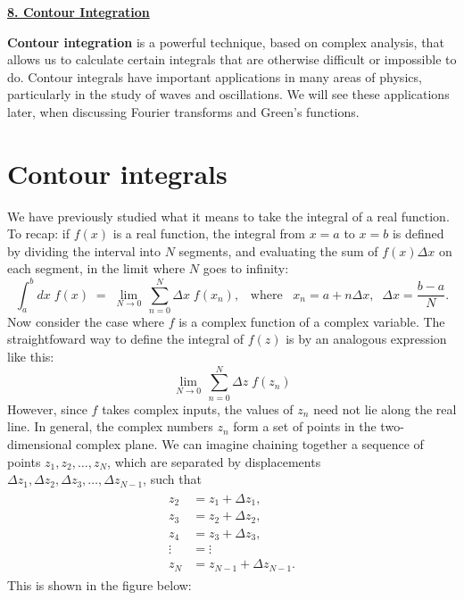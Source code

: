 \documentclass[10pt,a4paper]{article}
\begin{document}
\setcounter{page}{55}
\noindent
\underline{\textbf{\LARGE 8. Contour Integration}}
\vskip 0.1in

\textbf{Contour integration} is a powerful technique, based on complex
analysis, that allows us to calculate certain integrals that are
otherwise difficult or impossible to do. Contour integrals have
important applications in many areas of physics, particularly in the
study of waves and oscillations. We will see these applications later,
when discussing Fourier transforms and Green's functions.

\section{Contour integrals}\label{contour-integrals}

We have previously studied what it means to take the integral of a
real function. To recap: if $f(x)$ is a real function, the integral
from $x=a$ to $x=b$ is defined by dividing the interval into $N$
segments, and evaluating the sum of $f(x)\Delta x$ on each segment, in
the limit where $N$ goes to infinity:
\begin{equation}
  \int_a^b dx\; f(x) \;=\; \lim_{N \rightarrow 0} \, \sum_{n=0}^{N} \Delta x\; f(x_n), \;\;\;\mathrm{where}\;\;\;x_n = a + n\Delta x, \;\;\Delta x = \frac{b-a}{N}.
\end{equation}
Now consider the case where $f$ is a complex function of a complex
variable. The straightfoward way to define the integral of $f(z)$ is
by an analogous expression like this:
\begin{equation}
  \lim_{N \rightarrow 0} \, \sum_{n=0}^{N} \Delta z\; f(z_n)
\end{equation}
However, since $f$ takes complex inputs, the values of $z_n$ need not
lie along the real line. In general, the complex numbers $z_n$ form a
set of points in the two-dimensional complex plane. We can imagine
chaining together a sequence of points $z_1, z_2, \dots, z_N$, which
are separated by displacements $\Delta z_1, \Delta z_2, \Delta z_3,
\dots, \Delta z_{N-1}$, such that
\begin{align}
  \begin{aligned}
  z_2 &= z_1 + \Delta z_1, \\ z_3 &= z_2 + \Delta z_2, \\ z_4 &= z_3 + \Delta z_3, \\ \vdots &= \vdots\\
  z_N &= z_{N-1} + \Delta z_{N-1}.
  \end{aligned}
\end{align}
This is shown in the figure below:
\end{document}
